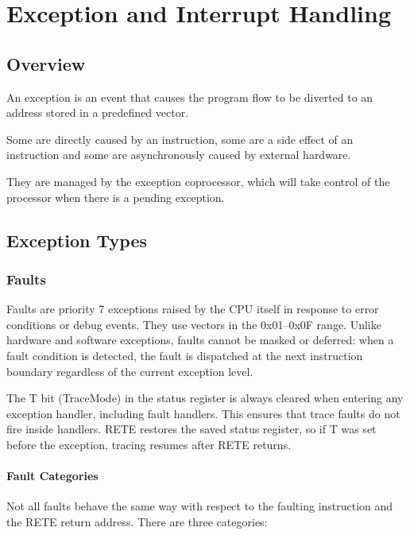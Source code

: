 \chapter{Exception and Interrupt Handling}
\label{ch:exceptions}

\section{Overview}

An exception is an event that causes the program flow to be diverted to an address stored in a predefined vector.

Some are directly caused by an instruction, some are a side effect of an instruction and some are asynchronously caused
by external hardware.

They are managed by the exception coprocessor, which will take control of the processor when there is a pending
exception.

\section{Exception Types}

\subsection{Faults}

Faults are priority 7 exceptions raised by the CPU itself in response to error conditions or debug events. They use
vectors in the 0x01--0x0F range. Unlike hardware and software exceptions, faults cannot be masked or deferred: when a
fault condition is detected, the fault is dispatched at the next instruction boundary regardless of the current
exception level.

The T bit (TraceMode) in the status register is always cleared when entering any exception handler, including fault
handlers. This ensures that trace faults do not fire inside handlers. RETE restores the saved status register, so if T
was set before the exception, tracing resumes after RETE returns.

\subsubsection{Fault Categories}

Not all faults behave the same way with respect to the faulting instruction and the RETE return address. There are
three categories:

